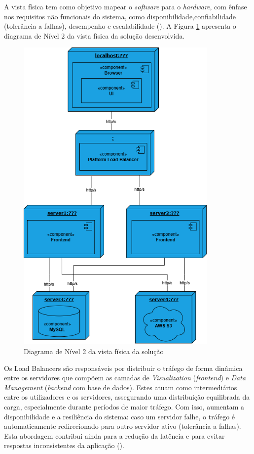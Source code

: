 A vista física tem como objetivo mapear o \textit{software} para o \textit{hardware}, com ênfase nos requisitos não funcionais do sistema, como disponibilidade,confiabilidade (tolerância a falhas), desempenho e escalabilidade (\cite{Kruchten1995}). A Figura \ref{fig:physical_view_lv2} apresenta o diagrama de Nível 2 da vista física da solução desenvolvida.

\begin{figure}[H]
    \centering
    \includegraphics[height=6.25in,keepaspectratio]{frontmatter/assets/diagrams/Physical View/physical_view_lv2.drawio.png}
    \caption{Diagrama de Nível 2 da vista física da solução}
    \label{fig:physical_view_lv2}
\end{figure}

Os Load Balancers são responsáveis por distribuir o tráfego de forma dinâmica entre os servidores que compõem as camadas de \textit{Visualization} (\textit{frontend}) e \textit{Data Management} (\textit{backend} com base de dados). Estes atuam como intermediários entre os utilizadores e os servidores, assegurando uma distribuição equilibrada da carga, especialmente durante períodos de maior tráfego. Com isso, aumentam a disponibilidade e a resiliência do sistema: caso um servidor falhe, o tráfego é automaticamente redirecionado para outro servidor ativo (tolerância a falhas). Esta abordagem contribui ainda para a redução da latência e para evitar respostas inconsistentes da aplicação (\Cite{F52025}).

